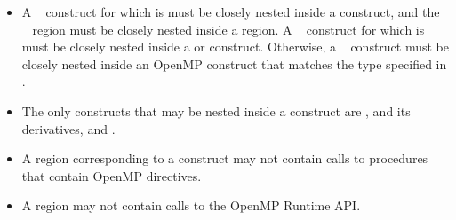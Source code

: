 \begin{itemize}
\item A ~ construct for which
 is  must be closely nested
inside a  construct, and the ~
region must be closely nested inside a  region. A
~ construct for which
 is  must be closely nested
inside a  or  construct. Otherwise, a
~ construct must be closely nested inside
an OpenMP construct that matches the type specified in
.


\item The only constructs that may be nested inside a  construct
    are ,  and its derivatives, and .

\item A  region corresponding to a  construct may not contain calls to procedures that contain
OpenMP directives. 

\item A  region  may not contain calls to the OpenMP Runtime
    API.


\end{itemize}
